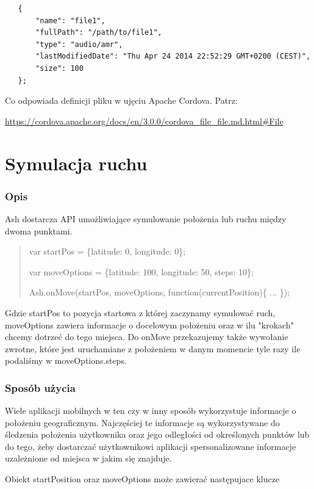 \documentclass[brudnopis]{xmgr}
\begin{document}
\begin{lstlisting}
   {
       "name": "file1",
       "fullPath": "/path/to/file1",
       "type": "audio/amr",
       "lastModifiedDate": "Thu Apr 24 2014 22:52:29 GMT+0200 (CEST)",
       "size": 100
   };
\end{lstlisting}

Co odpowiada definicji pliku w ujęciu Apache Cordova. Patrz:

\url{https://cordova.apache.org/docs/en/3.0.0/cordova_file_file.md.html#File}

\section{Symulacja ruchu}

\subsubsection{Opis}
Ash dostarcza API umożliwiające symulowanie położenia lub ruchu między dwoma punktami.

\begin{quote}
var startPos = \{latitude: 0, longitude: 0\};

var moveOptions = \{latitude: 100, longitude: 50, steps: 10\};

Ash.onMove(startPos, moveOptions, function(currentPosition)\{ ... \});
\end{quote}

Gdzie startPos to pozycja startowa z której zaczynamy symulować ruch, moveOptions zawiera informacje o docelowym położeniu oraz w ilu "krokach" chcemy dotrzeć do tego miejsca. Do onMove przekazujemy także wywołanie zwrotne, które jest uruchamiane z  położeniem w danym momencie tyle razy ile podaliśmy w moveOptions.steps. 

\subsubsection{Sposób użycia}

Wiele aplikacji mobilnych w ten czy w inny sposób wykorzystuje informacje o położeniu geograficznym. Najczęściej te informacje są wykorzystywane do śledzenia położenia użytkownika oraz jego odległości od określonych punktów lub do tego, żeby dostarczać użytkownikowi aplikacji spersonalizowane informacje uzależnione od miejsca w jakim się znajduje. 

Obiekt startPosition oraz moveOptions może zawierać następujace klucze
\end{document}
